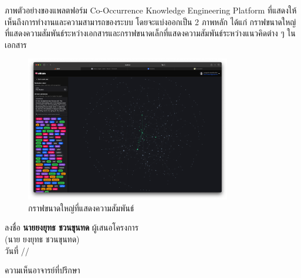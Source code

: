 \documentclass[12pt,a4paper]{article}
\newcommand{\textlight}[1]{{\thailightfont #1}}
\newcommand{\dotrule}[1]{\hdashrule{#1}{0.6pt}{1pt}}
\begin{document}
\begin{enumerate}[leftmargin=2cm]
    \vspace{1cm}

    \textlight{
        ภาพตัวอย่างของแพลตฟอร์ม Co-Occurrence Knowledge Engineering Platform ที่แสดงให้เห็นถึงการทำงานและความสามารถของระบบ โดยจะแบ่งออกเป็น 2 ภาพหลัก ได้แก่ กราฟขนาดใหญ่ที่แสดงความสัมพันธ์ระหว่างเอกสารและกราฟขนาดเล็กที่แสดงความสัมพันธ์ระหว่างแนวคิดต่าง ๆ ในเอกสาร
    }

    \begin{figure}[H]
        \centering
        \includegraphics[width=0.8\textwidth]{images/platform_1.png}
        \caption{กราฟขนาดใหญ่ที่แสดงความสัมพันธ์}
        \label{fig:platform_1}
    \end{figure}

\end{enumerate}

\vspace{5cm}

\hfill\begin{minipage}{10cm}
    \vspace{0.5cm}
    \begin{center}
        \textlight{ลงชื่อ \textbf{นายยงยุทธ ชวนขุนทด} ผู้เสนอโครงการ}\\[0.2cm]
        \textlight{(นาย ยงยุทธ ชวนขุนทด)}\\[0.4cm]
        \textlight{วันที่ \dotrule{50pt}/\dotrule{50pt}/\dotrule{50pt}}
    \end{center}
    \vspace{0.5cm}
\end{minipage}         

\vspace{0.5cm}

\textlight{ความเห็นอาจารย์ที่ปรึกษา}
\dotrule{378pt}

\dotrule{500pt}
\end{document}
